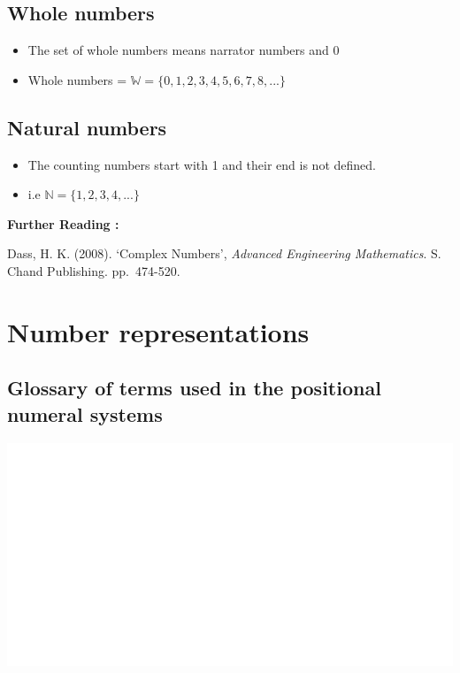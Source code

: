\documentclass[]{book}
\providecommand{\tightlist}{%
  \setlength{\itemsep}{0pt}\setlength{\parskip}{0pt}}
\begin{document}
\hypertarget{whole-numbers}{%
\subsection{Whole numbers}\label{whole-numbers}}

\begin{itemize}
\tightlist
\item
  The set of whole numbers means narrator numbers and \(0\)
\item
  Whole numbers = \(\mathbb{W} = \{ 0,1,2,3,4,5,6,7,8,...\}\)
\end{itemize}

\hypertarget{natural-numbers}{%
\subsection{Natural numbers}\label{natural-numbers}}

\begin{itemize}
\tightlist
\item
  The counting numbers start with 1 and their end is not defined.
\item
  i.e \(\mathbb{N} =\{1,2,3,4,...\}\)
\end{itemize}

\textbf{Further Reading :}

Dass, H. K. (2008). `Complex Numbers', \emph{Advanced Engineering Mathematics}. S. Chand Publishing. pp.~474-520.

\hypertarget{number-representations}{%
\section{Number representations}\label{number-representations}}

\hypertarget{glossary-of-terms-used-in-the-positional-numeral-systems}{%
\subsection{Glossary of terms used in the positional numeral systems}\label{glossary-of-terms-used-in-the-positional-numeral-systems}}

\begin{center}\includegraphics[width=1\linewidth]{figure/NSbox1-1} \end{center}
\end{document}
